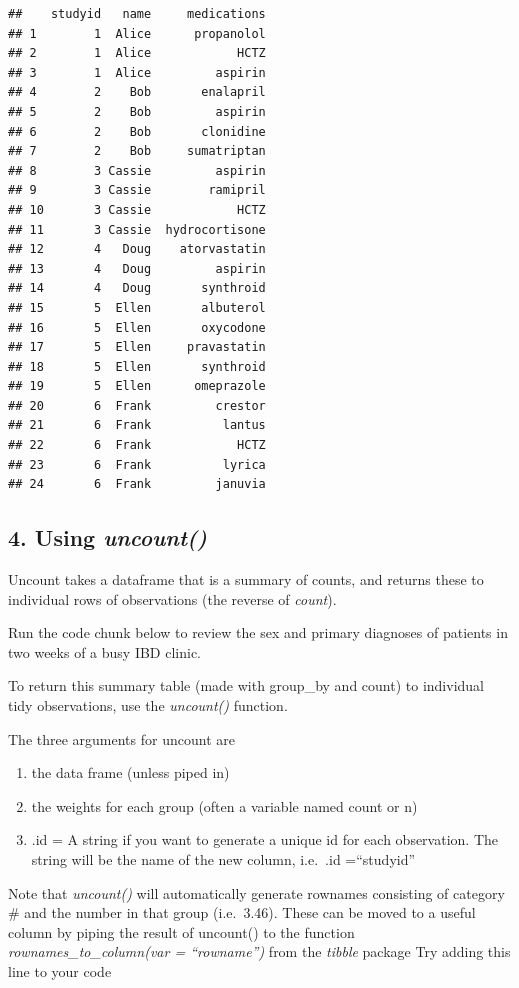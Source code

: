 \documentclass[
]{book}
\providecommand{\tightlist}{%
  \setlength{\itemsep}{0pt}\setlength{\parskip}{0pt}}
\begin{document}
\begin{verbatim}
##    studyid   name     medications
## 1        1  Alice      propanolol
## 2        1  Alice            HCTZ
## 3        1  Alice         aspirin
## 4        2    Bob       enalapril
## 5        2    Bob         aspirin
## 6        2    Bob       clonidine
## 7        2    Bob     sumatriptan
## 8        3 Cassie         aspirin
## 9        3 Cassie        ramipril
## 10       3 Cassie            HCTZ
## 11       3 Cassie  hydrocortisone
## 12       4   Doug    atorvastatin
## 13       4   Doug         aspirin
## 14       4   Doug       synthroid
## 15       5  Ellen       albuterol
## 16       5  Ellen       oxycodone
## 17       5  Ellen     pravastatin
## 18       5  Ellen       synthroid
## 19       5  Ellen      omeprazole
## 20       6  Frank         crestor
## 21       6  Frank          lantus
## 22       6  Frank            HCTZ
## 23       6  Frank          lyrica
## 24       6  Frank         januvia
\end{verbatim}

\hypertarget{using-uncount}{%
\subsection{\texorpdfstring{4. Using \emph{uncount()}}{4. Using uncount()}}\label{using-uncount}}

Uncount takes a dataframe that is a summary of counts, and returns these to individual rows of observations (the reverse of \emph{count}).

Run the code chunk below to review the sex and primary diagnoses of patients in two weeks of a busy IBD clinic.

To return this summary table (made with group\_by and count) to individual tidy observations, use the \emph{uncount()} function.

The three arguments for uncount are

\begin{enumerate}
\def\labelenumi{\arabic{enumi}.}
\tightlist
\item
  the data frame (unless piped in)
\item
  the weights for each group (often a variable named count or n)
\item
  .id = A string if you want to generate a unique id for each observation. The string will be the name of the new column, i.e.~.id =``studyid''
\end{enumerate}

Note that \emph{uncount()} will automatically generate rownames consisting of category \# and the number in that group (i.e.~3.46). These can be moved to a useful column by piping the result of uncount() to the function
\emph{rownames\_to\_column(var = ``rowname'')} from the \emph{tibble} package
Try adding this line to your code
\end{document}
